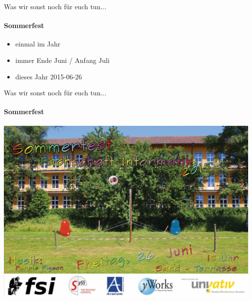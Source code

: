 \documentclass{beamer}
\begin{document}

	\begin{frame}{Was wir sonst noch für euch tun...}
	\framesubtitle{Sommerfest}
				\begin{itemize}
					\item einmal im Jahr
					\item immer Ende Juni / Anfang Juli
					\item dieses Jahr 2015-06-26
				\end{itemize}
	\end{frame}
	
	\begin{frame}{Was wir sonst noch für euch tun...}
		\framesubtitle{Sommerfest}
		\includegraphics[width=\linewidth]{sf15.jpg}
	\end{frame}
		
\end{document}
